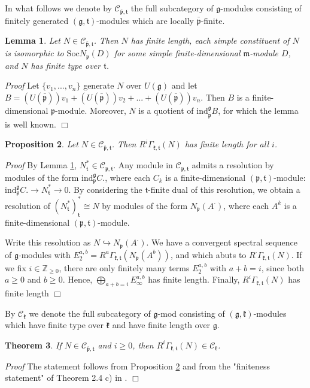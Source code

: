 \documentclass[11pt]{amsart}
\newcounter{theorem}
\newtheorem{theo}{Theorem}[section]
\newtheorem{lemma}[theo]{Lemma}
\newtheorem{prop}[theo]{Proposition}
\renewenvironment{proof}{ \emph{Proof}}{$\Box$}
\renewcommand{\tt}{\mathfrak{t}}
\newcommand{\kk}{\mathfrak{k}}
\newcommand{\mm}{\mathfrak{m}}
\newcommand{\pp}{\mathfrak{p}}
\renewcommand{\gg}{\mathfrak{g}}
\newcommand{\refle}[1]{Lemma \ref{#1}}
\newcommand{\refprop}[1]{Proposition \ref{#1}}
\newcommand{\Soc}{\mathrm{Soc}}
\newcommand{\ind}{\mathrm{ind}}
\newcommand{\field}[1]{\mathbb{#1}}
\begin{document}
In what follows we denote by $\mathcal{C}_{\bar{\pp},\tt}$ the full subcategory of $\gg$-modules consisting of finitely generated $(\gg,\tt)$-modules which are locally $\bar{\pp}$-finite.
\begin{lemma}\label{le2.8}
Let $N\in\mathcal{C}_{\bar{\pp},\tt}$. Then $N$ has finite length, each simple constituent of $N$ is isomorphic to $\Soc N_\pp(D)$ for some simple finite-dimensional $\mm$-module $D$, and $N$ has finite type over $\tt$.
\end{lemma}
\begin{proof}
Let $\{v_1,...,v_n\}$ generate $N$ over $U(\gg)$ and let $B=(U(\bar{\pp}))v_1+(U(\bar{\pp}))v_2+...+(U(\bar{\pp}))v_n$. Then $B$ is a finite-dimensional $\pp$-module. Moreover, $N$ is a quotient of $\ind_{\bar{\pp}}^\gg B$, for which the lemma is well known.
\end{proof}
\begin{prop}\label{pr2.9}
Let $N\in\mathcal{C}_{\bar{\pp},\tt}$. Then $R^{i}\Gamma_{\kk,\tt}(N)$ has finite length for all $i$.
\end{prop}
\begin{proof}
By \refle{le2.8}, $N_{\tt}^*\in\mathcal{C}_{\pp,\tt}$. Any module in $\mathcal{C}_{\pp,\tt}$ admits a resolution by modules of the form $\ind_\pp^\gg C.$, where each $C_{k}$ is a finite-dimensional $(\pp,\tt)$-module: $\ind_\pp^\gg C.\rightarrow N^*_{\tt}\rightarrow 0$. By considering the $\tt$-finite dual of this resolution, we obtain a resolution of $(N^*_{\tt})^*_{\tt}\cong N$ by modules of the form $N_\pp(A^{\cdot})$, where each $A^k$ is a finite-dimensional $(\pp,\tt)$-module.

Write this resolution as $N\hookrightarrow N_\pp(A^{\cdot})$. We have a convergent spectral sequence of $\gg$-modules with $E_2^{a,b}=R^a\Gamma_{\kk,\tt}(N_\pp(A^b))$, and which abuts to $R^{\cdot}\Gamma_{\kk,\tt}(N)$. If we fix $i\in\field{Z}_{\geq 0}$, there are only finitely many terms $E_2^{a,b}$ with $a+b=i$, since both $a\geq 0$ and $b\geq 0$. Hence, $\bigoplus_{a+b=i}E_{\infty}^{a,b}$ has finite length. Finally, $R^{i}\Gamma_{\kk,\tt}(N)$ has finite length
\end{proof}

By $\mathcal{C}_{\kk}$ we denote the full subcategory of $\gg$-mod consisting of $(\gg,\kk)$-modules which have finite type over $\kk$ and have finite length over $\gg$.
\begin{theo}
If $N\in\mathcal{C}_{\bar{\pp},\tt}$ and $i\geq 0$, then $R^{i}\Gamma_{\kk,\tt}(N)\in\mathcal{C}_{\kk}$.
\end{theo}
\begin{proof}
The statement follows from \refprop{pr2.9} and from the "finiteness statement" of Theorem 2.4 c) in \cite{Z}.
\end{proof}
\end{document}
